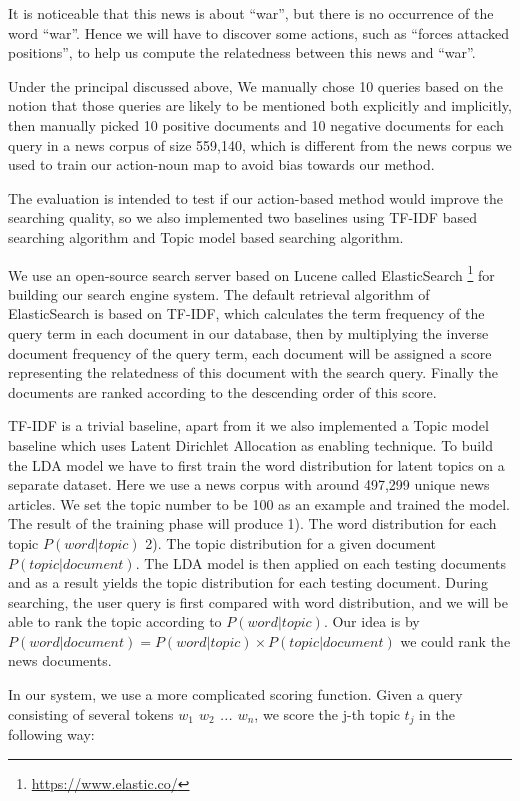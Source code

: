 It is noticeable that this news is about ``war'', but there is no occurrence of the word ``war''. Hence we will have to
discover some actions, such as ``forces attacked positions'', to help us compute the relatedness between this news and ``war''.

Under the principal discussed above, We manually chose 10 queries based on the notion that those queries are likely to be mentioned
both explicitly and implicitly, then manually picked 10 positive documents and 10 negative documents
for each query in a news corpus of size 559,140, which is different from the news corpus we used to train our action-noun map
 to avoid bias towards our method.


The evaluation is intended to test if our action-based method would improve the searching quality, so we also implemented
two baselines using TF-IDF based searching algorithm and Topic model based searching algorithm.

We use an open-source search server based on Lucene called ElasticSearch \footnote{\url{https://www.elastic.co/}} for building our search engine system. The default retrieval algorithm of ElasticSearch
is based on TF-IDF, which calculates the term frequency of the query term in each document in our database, then by multiplying the
inverse document frequency of the query term, each document will be assigned a score representing the relatedness of this document with the
search query. Finally the documents are ranked according to the descending order of this score.

TF-IDF is a trivial baseline, apart from it we also implemented a Topic model baseline which uses Latent Dirichlet Allocation as enabling
technique. To build the LDA model we have to first train the word distribution for latent topics on a separate dataset. Here we use
a news corpus with around 497,299 unique news articles. We set the topic number to be 100 as an example and trained the model.
The result of the training phase will produce 1). The word distribution for each topic $P(word | topic)$ 2). The topic
distribution for a given document $P(topic | document)$.
The LDA model is then applied on each testing documents and as a result yields the topic distribution for each testing document.
During searching, the user query is first compared with word distribution, and we will be able to rank the topic according to $P(word | topic)$. Our idea is by $P(word | document) = P(word | topic) \times P(topic | document)$ we could rank the news documents.

In our system, we use a more complicated scoring function. Given a query consisting of several tokens \emph{$w_1$ $w_2$ ... $w_n$}, we score the j-th topic $t_j$ in the following way:

